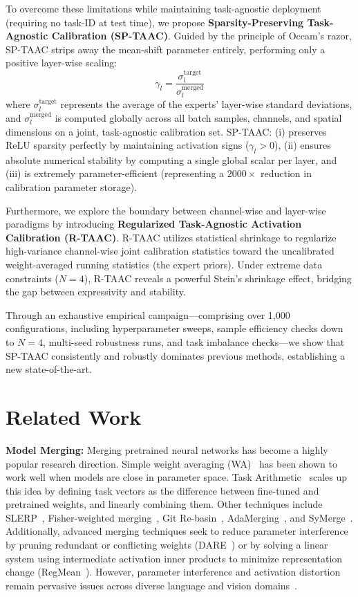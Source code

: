 \documentclass{article}
\theoremstyle{plain}
\theoremstyle{definition}
\theoremstyle{remark}
\begin{document}
To overcome these limitations while maintaining task-agnostic deployment (requiring no task-ID at test time), we propose \textbf{Sparsity-Preserving Task-Agnostic Calibration (SP-TAAC)}. Guided by the principle of Occam's razor, SP-TAAC strips away the mean-shift parameter entirely, performing only a positive layer-wise scaling:
\begin{equation}
\gamma_l = \frac{\sigma_l^{\text{target}}}{\sigma_l^{\text{merged}}}
\end{equation}
where $\sigma_l^{\text{target}}$ represents the average of the experts' layer-wise standard deviations, and $\sigma_l^{\text{merged}}$ is computed globally across all batch samples, channels, and spatial dimensions on a joint, task-agnostic calibration set. SP-TAAC: (i) preserves ReLU sparsity perfectly by maintaining activation signs ($\gamma_l > 0$), (ii) ensures absolute numerical stability by computing a single global scalar per layer, and (iii) is extremely parameter-efficient (representing a $2000\times$ reduction in calibration parameter storage).

Furthermore, we explore the boundary between channel-wise and layer-wise paradigms by introducing \textbf{Regularized Task-Agnostic Activation Calibration (R-TAAC)}. R-TAAC utilizes statistical shrinkage to regularize high-variance channel-wise joint calibration statistics toward the uncalibrated weight-averaged running statistics (the expert priors). Under extreme data constraints ($N=4$), R-TAAC reveals a powerful Stein's shrinkage effect, bridging the gap between expressivity and stability.

Through an exhaustive empirical campaign—comprising over 1,000 configurations, including hyperparameter sweeps, sample efficiency checks down to $N=4$, multi-seed robustness runs, and task imbalance checks—we show that SP-TAAC consistently and robustly dominates previous methods, establishing a new state-of-the-art.

\section{Related Work}
\label{sec:related}

\textbf{Model Merging:} Merging pretrained neural networks has become a highly popular research direction. Simple weight averaging (WA)~\cite{wortsman2022model} has been shown to work well when models are close in parameter space. Task Arithmetic~\cite{ilharco2022editing} scales up this idea by defining task vectors as the difference between fine-tuned and pretrained weights, and linearly combining them. Other techniques include SLERP~\cite{choset2024slerp}, Fisher-weighted merging~\cite{matena2022merging}, Git Re-basin~\cite{ainsworth2022git}, AdaMerging~\cite{adamerging2024}, and SyMerge~\cite{symerge2025}. Additionally, advanced merging techniques seek to reduce parameter interference by pruning redundant or conflicting weights (DARE~\cite{yu2023language}) or by solving a linear system using intermediate activation inner products to minimize representation change (RegMean~\cite{jin2022regmean}). However, parameter interference and activation distortion remain pervasive issues across diverse language and vision domains~\cite{yu2024language}.
\end{document}
